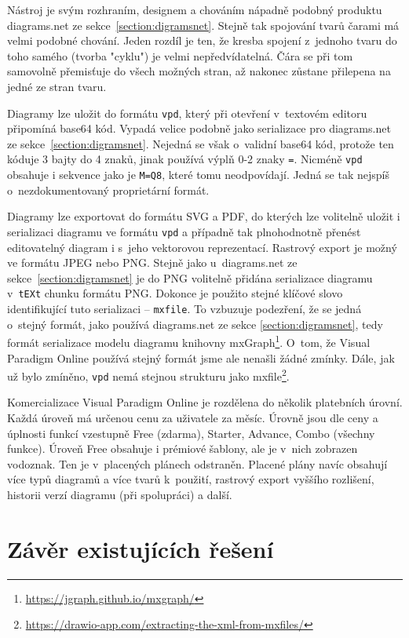 Nástroj je svým rozhraním, designem a chováním nápadně podobný produktu diagrams.net ze sekce~\ref{section:digramsnet}.
Stejně tak spojování tvarů čarami má velmi podobné chování.
Jeden rozdíl je ten, že kresba spojení z~jednoho tvaru do toho samého (tvorba "cyklu") je velmi nepředvídatelná.
Čára se při tom samovolně přemisťuje do všech možných stran, až nakonec zůstane přilepena na jedné ze stran tvaru.

Diagramy lze uložit do formátu \texttt{vpd}, který při otevření v~textovém editoru připomíná base64 kód.
Vypadá velice podobně jako serializace pro diagrams.net ze sekce~\ref{section:digramsnet}.
Nejedná se však o~validní base64 kód, protože ten kóduje 3 bajty do 4 znaků, jinak používá výplň 0-2 znaky \texttt{=}.
Nicméně \texttt{vpd} obsahuje i sekvence jako je \texttt{M=Q8}, které tomu neodpovídají.
Jedná se tak nejspíš o~nezdokumentovaný proprietární formát.

Diagramy lze exportovat do formátu SVG a PDF, do kterých lze volitelně uložit i serializaci diagramu ve formátu \texttt{vpd} a případně tak plnohodnotně přenést editovatelný diagram i s~jeho vektorovou reprezentací.
Rastrový export je možný ve formátu JPEG nebo PNG.
Stejně jako u~diagrams.net ze sekce~\ref{section:digramsnet} je do PNG volitelně přidána serializace diagramu v~\texttt{tEXt} chunku formátu PNG.
Dokonce je použito stejné klíčové slovo identifikující tuto serializaci -- \texttt{mxfile}.
To vzbuzuje podezření, že se jedná o~stejný formát, jako používá diagrams.net ze sekce \ref{section:digramsnet}, tedy formát serializace modelu diagramu knihovny mxGraph\footnote{\url{https://jgraph.github.io/mxgraph/}}.
O~tom, že Visual Paradigm Online používá stejný formát jsme ale nenašli žádné zmínky.
Dále, jak už bylo zmíněno, \texttt{vpd} nemá stejnou strukturu jako mxfile\footnote{\url{https://drawio-app.com/extracting-the-xml-from-mxfiles/}}.

Komercializace Visual Paradigm Online je rozdělena do několik platebních úrovní.
Každá úroveň má určenou cenu za uživatele za měsíc.
Úrovně jsou dle ceny a úplnosti funkcí vzestupně Free (zdarma), Starter, Advance, Combo (všechny funkce).
Úroveň Free obsahuje i prémiové šablony, ale je v~nich zobrazen vodoznak.
Ten je v~placených plánech odstraněn.
Placené plány navíc obsahují více typů diagramů a více tvarů k~použití, rastrový export vyššího rozlišení, historii verzí diagramu (při spolupráci) a další.

\section{Závěr existujících řešení}


